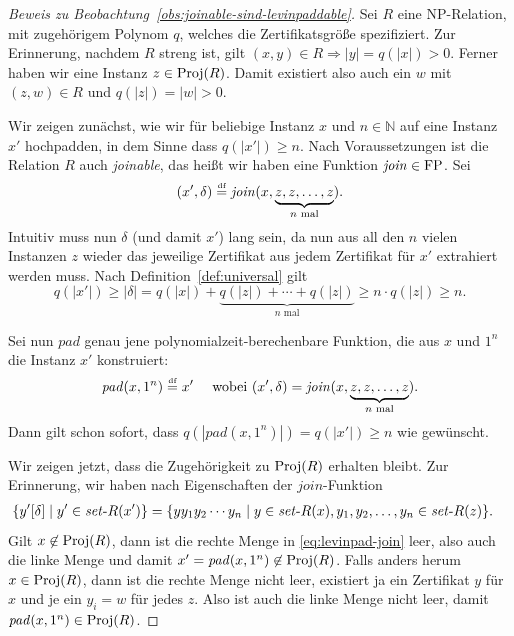 \medskip
\begin{proof}[Beweis zu Beobachtung~\ref{obs:joinable-sind-levinpaddable}]
    Sei $R$ eine NP-Relation, mit zugehörigem Polynom $q$, welches die Zertifikatsgröße spezifiziert. Zur Erinnerung, nachdem $R$ streng ist, gilt $(x,y)\in R \Rightarrow |y|=q(|x|)>0$.
    Ferner haben wir eine Instanz $z\in\operatorname{Proj}(R)$. Damit existiert also auch ein $w$ mit $(z,w)\in R$ und $q(|z|)=|w|>0$.

    Wir zeigen zunächst, wie wir für beliebige Instanz $x$ und $n\in\mathbb N$ auf eine Instanz $x'$ hochpadden, in dem Sinne dass $q(|x'|) \geq n$.
    Nach Voraussetzungen  ist die Relation $R$ auch \emph{joinable}, das heißt wir haben eine Funktion $\mathit{join}\in\mathrm{FP}$. Sei 
    \[ (x',\delta)\stackrel{\text{\smash{\tiny df}}}{=} \mathit{join}(x, \underbrace{z, z, \ldots, z}_{\text{$n$ mal}}).\]
    Intuitiv muss nun $\delta$ (und damit $x'$) lang sein, da nun aus all den $n$ vielen Instanzen $z$ wieder das jeweilige Zertifikat aus jedem Zertifikat für $x'$ extrahiert werden muss.
    Nach Definition~\ref{def:universal} gilt
    \[ q(|x'|) \geq |\delta|=q(|x|) + \underbrace{q(|z|) + \cdots + q(|z|)}_{\text{$n$ mal}} \geq  n\cdot q(|z|) \geq n. \]

    Sei nun $\mathit{pad}$ genau jene polynomialzeit-berechenbare Funktion, die aus $x$ und $1^n$ die Instanz $x'$ konstruiert:
    \[ \mathit{pad}(x, 1^n) \stackrel{\text{\smash{\tiny df}}}{=}  x' \quad\text{ wobei }
    (x',\delta)=\mathit{join}(x, \underbrace{z,z,\ldots, z}_{\text{$n$ mal}}).\]
    Dann gilt schon sofort, dass $q(|\mathit{pad}(x, 1^n)|)=q(|x'|)\geq n$ wie gewünscht.

    Wir zeigen jetzt, dass die Zugehörigkeit zu $\operatorname{Proj}(R)$ erhalten bleibt.
    Zur Erinnerung, wir haben nach Eigenschaften der $\mathit{join}$-Funktion
    \begin{align}\label{eq:levinpad-join} &\{ y'[\delta] \mid y'\in\fset{}R(x') \} = \{ yy_1y_2\cdots y_{n} \mid  y\in\fset{}R(x), y_1,y_2,\dots,y_n\in\fset{}R(z) \}. \end{align}
    Gilt $x\not\in\operatorname{Proj}(R)$, dann ist die rechte Menge in \eqref{eq:levinpad-join} leer, also auch die linke Menge und damit $x'=\mathit{pad}(x, 1^n)\not\in \operatorname{Proj}(R)$.
    Falls anders herum $x\in\operatorname{Proj}(R)$, dann ist die rechte Menge nicht leer, existiert ja ein Zertifikat $y$ für $x$ und je ein $y_i=w$ für jedes $z$. Also ist auch die linke Menge nicht leer, damit $\mathit{pad}(x, 1^n)\in \operatorname{Proj}(R)$.


\end{proof}
